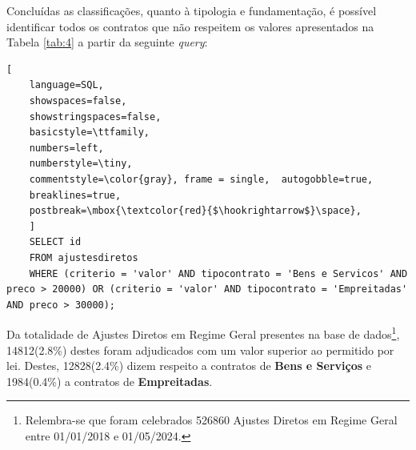 %	

%	
%	


Concluídas as classificações, quanto à tipologia e fundamentação, é possível identificar todos os contratos que não respeitem os valores apresentados na Tabela \ref{tab:4} a partir da seguinte \textit{query}: 


\begin{lstlisting}[
	language=SQL,
	showspaces=false,
	showstringspaces=false,
	basicstyle=\ttfamily,
	numbers=left,
	numberstyle=\tiny,
	commentstyle=\color{gray}, frame = single,	autogobble=true,
	breaklines=true,
	postbreak=\mbox{\textcolor{red}{$\hookrightarrow$}\space},
	]
	SELECT id
	FROM ajustesdiretos
	WHERE (criterio = 'valor' AND tipocontrato = 'Bens e Servicos' AND preco > 20000) OR (criterio = 'valor' AND tipocontrato = 'Empreitadas' AND preco > 30000);
\end{lstlisting}

Da totalidade de Ajustes Diretos em Regime Geral presentes na base de dados\footnote{Relembra-se que foram celebrados 526860 Ajustes Diretos em Regime Geral entre 01/01/2018 e 01/05/2024.}, 14812(2.8\%) destes foram adjudicados com um valor superior ao permitido por lei. Destes, 12828(2.4\%) dizem respeito a contratos de \textbf{Bens e Serviços} e 1984(0.4\%) a contratos de \textbf{Empreitadas}.


